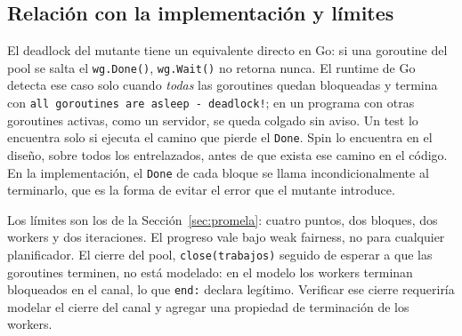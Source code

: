 \subsection{Relación con la implementación y límites}

El deadlock del mutante tiene un equivalente directo en Go: si una goroutine del pool se salta el
\texttt{wg.Done()}, \texttt{wg.Wait()} no retorna nunca. El runtime de Go detecta ese caso solo
cuando \emph{todas} las goroutines quedan bloqueadas y termina con \texttt{all goroutines are asleep
- deadlock!}; en un programa con otras goroutines activas, como un servidor, se queda colgado sin
aviso. Un test lo encuentra solo si ejecuta el camino que pierde el \texttt{Done}. Spin lo encuentra
en el diseño, sobre todos los entrelazados, antes de que exista ese camino en el código. En la
implementación, el \texttt{Done} de cada bloque se llama incondicionalmente al terminarlo, que es la
forma de evitar el error que el mutante introduce.

Los límites son los de la Sección~\ref{sec:promela}: cuatro puntos, dos bloques, dos workers y dos
iteraciones. El progreso vale bajo weak fairness, no para cualquier planificador. El cierre del pool,
\texttt{close(trabajos)} seguido de esperar a que las goroutines terminen, no está modelado: en el
modelo los workers terminan bloqueados en el canal, lo que \texttt{end:} declara legítimo. Verificar
ese cierre requeriría modelar el cierre del canal y agregar una propiedad de terminación de los
workers.
